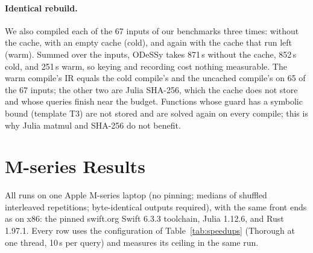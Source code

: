 \documentclass[acmsmall,screen,nonacm]{acmart}
\newcommand{\odessy}{ODeSSy}
\newcommand{\tool}{\odessy}
\begin{document}
\paragraph{Identical rebuild.} We also compiled each of the 67 inputs of
our benchmarks three times: without the cache, with an empty cache (cold),
and again with the cache that run left (warm). Summed over the inputs,
\tool{} takes 871\,s without the cache, 852\,s cold, and 251\,s warm, so
keying and recording cost nothing measurable. The warm compile's IR equals
the cold compile's and the uncached compile's on 65 of the 67 inputs; the
other two are Julia SHA-256, which the cache does not store and whose
queries finish near the budget. Functions whose guard has a symbolic bound
(template T3) are not stored and are solved again on every compile; this is
why Julia matmul and SHA-256 do not benefit.

\section{M-series Results}
\label{sec:app-mseries}
All runs on one Apple M-series laptop (no pinning; medians of shuffled
interleaved repetitions; byte-identical outputs required), with the
same front ends as on x86: the pinned swift.org Swift 6.3.3 toolchain,
Julia 1.12.6, and Rust 1.97.1. Every row uses the
configuration of Table~\ref{tab:speedups} (Thorough at one thread,
10\,s per query) and measures its ceiling in the same run.
\end{document}
